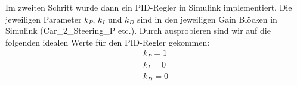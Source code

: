 Im zweiten Schritt wurde dann ein PID-Regler in Simulink implementiert. Die
jeweiligen Parameter $k_P$, $k_I$ und $k_D$ sind in den jeweiligen Gain Blöcken
in Simulink (Car\_2\_Steering\_P etc.). Durch ausprobieren sind wir auf die
folgenden idealen Werte für den PID-Regler gekommen:
\begin{align*}
    k_P = 1 \\
    k_I = 0 \\
    k_D = 0
\end{align*}

